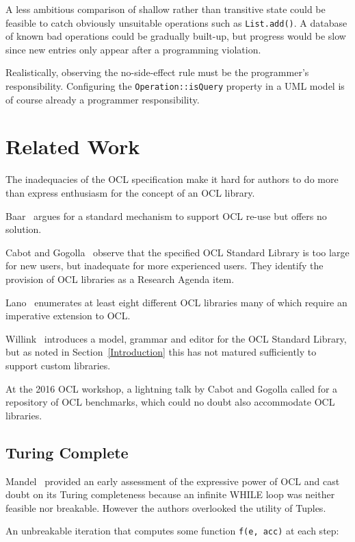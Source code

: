 \documentclass[sigconf]{acmart}
\begin{document}
A less ambitious comparison of shallow rather than transitive state could be feasible to catch obviously unsuitable operations such as \verb|List.add()|. A database of known bad operations could be gradually built-up, but progress would be slow since new entries only appear after a programming violation.

Realistically, observing the no-side-effect rule must be the programmer's responsibility. Configuring the \verb|Operation::isQuery| property in a UML model is of course already a programmer responsibility.

\section{Related Work}\label{Related Work}

The inadequacies of the OCL specification make it hard for authors to do more than express enthusiasm for the concept of an OCL library.

Baar~\cite{Baar2011} argues for a standard mechanism to support OCL re-use but offers no solution. 

Cabot and Gogolla~\cite{Cabot2012} observe that the specified OCL Standard Library is too large for new users, but inadequate for more experienced users. They identify the provision of OCL libraries as a Research Agenda item. 

Lano~\cite{Lano2022} enumerates at least eight different OCL libraries many of which require an imperative extension to OCL.

Willink~\cite{Willink2011} introduces a model, grammar and editor for the OCL Standard Library, but as noted in Section~\ref{Introduction} this has not matured sufficiently to support custom libraries. 

At the 2016 OCL workshop, a lightning talk by Cabot and Gogolla called for a repository of OCL benchmarks, which could no doubt also accommodate OCL libraries.

\subsection{Turing Complete}\label{Turing Complete}

Mandel~\cite{Mandel1999} provided an early assessment of the expressive power of OCL and cast doubt on its Turing completeness because an infinite WHILE loop was neither feasible nor breakable. However the authors overlooked the utility of Tuples.

An unbreakable iteration that computes some function \verb|f(e, acc)| at each step:
\end{document}
